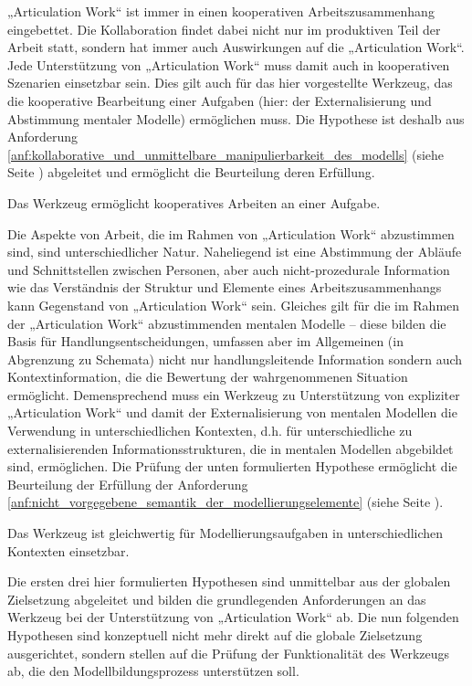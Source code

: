 „Articulation Work“ ist immer in einen kooperativen Arbeitszusammenhang eingebettet. Die Kollaboration findet dabei nicht nur im produktiven Teil der Arbeit statt, sondern hat immer auch Auswirkungen auf die „Articulation Work“. Jede Unterstützung von „Articulation Work“ muss damit auch in kooperativen Szenarien einsetzbar sein. Dies gilt auch für das hier vorgestellte Werkzeug, das die kooperative Bearbeitung einer Aufgaben (hier: der Externalisierung und Abstimmung mentaler Modelle) ermöglichen muss. Die Hypothese ist deshalb aus Anforderung \ref{anf:kollaborative_und_unmittelbare_manipulierbarkeit_des_modells} (siehe Seite \pageref{anf:kollaborative_und_unmittelbare_manipulierbarkeit_des_modells}) abgeleitet und ermöglicht die Beurteilung deren Erfüllung.

\begin{hyp}
	\label{hyp:kollaborativ}
	Das Werkzeug ermöglicht kooperatives Arbeiten an einer Aufgabe.
\end{hyp}

Die Aspekte von Arbeit, die im Rahmen von „Articulation Work“ abzustimmen sind, sind unterschiedlicher Natur. Naheliegend ist eine Abstimmung der Abläufe und Schnittstellen zwischen Personen, aber auch nicht-prozedurale Information wie das Verständnis der Struktur und Elemente eines Arbeitszusammenhangs kann Gegenstand von „Articulation Work“ sein. Gleiches gilt für die im Rahmen der „Articulation Work“ abzustimmenden mentalen Modelle -- diese bilden die Basis für Handlungsentscheidungen, umfassen aber im Allgemeinen (in Abgrenzung zu Schemata) nicht nur handlungsleitende Information sondern auch Kontextinformation, die die Bewertung der wahrgenommenen Situation ermöglicht. Demensprechend muss ein Werkzeug zu Unterstützung von expliziter „Articulation Work“ und damit der Externalisierung von mentalen Modellen die Verwendung in unterschiedlichen Kontexten, d.h. für unterschiedliche zu externalisierenden Informationsstrukturen, die in mentalen Modellen abgebildet sind, ermöglichen. Die Prüfung der unten formulierten Hypothese ermöglicht die Beurteilung der Erfüllung der Anforderung \ref{anf:nicht_vorgegebene_semantik_der_modellierungselemente} (siehe Seite \pageref{anf:nicht_vorgegebene_semantik_der_modellierungselemente}).

\begin{hyp}
	\label{hyp:kontexte}
	Das Werkzeug ist gleichwertig für Modellierungsaufgaben in unterschiedlichen Kontexten einsetzbar.
\end{hyp}

Die ersten drei hier formulierten Hypothesen sind unmittelbar aus der globalen Zielsetzung abgeleitet und bilden die grundlegenden Anforderungen an das Werkzeug bei der Unterstützung von „Articulation Work“ ab. Die nun folgenden Hypothesen sind konzeptuell nicht mehr direkt auf die globale Zielsetzung ausgerichtet, sondern stellen auf die Prüfung der Funktionalität des Werkzeugs ab, die den Modellbildungsprozess unterstützen soll. 

